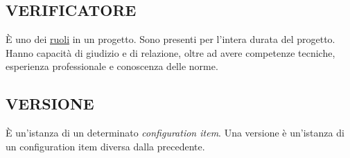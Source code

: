 		\subsection{VERIFICATORE}  \label{verificatore}
		È uno dei \underline{\hyperref[ruoli]{ruoli}} in un progetto.
		Sono presenti per l’intera durata del progetto.
		Hanno capacità di giudizio e di relazione, oltre ad avere competenze tecniche, esperienza professionale e conoscenza	delle norme. \\


		\subsection{VERSIONE}  \label{versione}
		È un'istanza di un determinato \textit{configuration item}. Una versione è un'istanza di un configuration item diversa dalla precedente.
